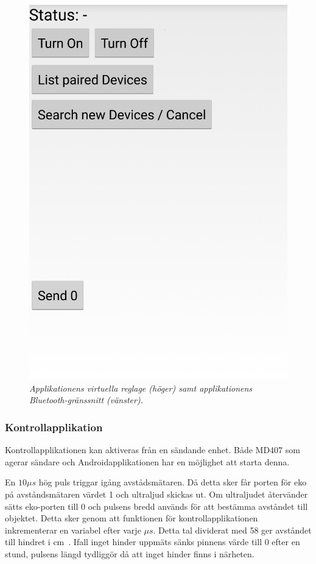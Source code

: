 \documentclass[a4paper]{article}
\begin{document}
\begin{figure}[H]
\includegraphics[scale=0.2]{applikation2.png}
\centering
\caption{\it Applikationens virtuella reglage (höger) samt applikationens Bluetooth-gränssnitt (vänster).}
\end{figure} 

\subsubsection{Kontrollapplikation}
Kontrollapplikationen kan aktiveras från en sändande enhet. Både MD407 som agerar sändare och Androidapplikationen har en möjlighet att starta denna. %


\vspace{5mm} \noindent
En $10\mu s$ hög puls triggar igång avstådsmätaren. Då detta sker får porten för eko på avståndsmätaren värdet 1 och ultraljud skickas ut. Om ultraljudet återvänder sätts eko-porten till 0 och pulsens bredd används för att bestämma avståndet till objektet. Detta sker genom att funktionen för kontrollapplikationen inkrementerar en variabel efter varje $\mu s$. Detta tal dividerat med 58 ger avståndet till hindret i cm~\cite{DistMeasure}. Ifall inget hinder uppmäts sänks pinnens värde till 0 efter en stund, pulsens längd tydliggör då att inget hinder finns i närheten.
\end{document}
